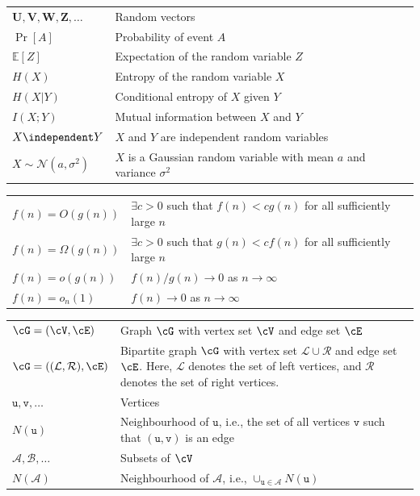 \documentclass[main.tex]{subfiles}
\begin{document}
\begin{center}
\begin{tabular}{|>{\centering}p{3cm}|p{11cm}|}
      $\mathbf{U},\mathbf{V},\mathbf{W},\mathbf{Z},\ldots$ & Random vectors\\
      $\Pr[A]$ & Probability of event $A$\\
      $\mathbb{E}[Z]$ & Expectation of the random variable $Z$\\
      $H(X)$ & Entropy of the random variable $X$\\
      $H(X|Y)$ & Conditional entropy of $X$ given $Y$\\
      $I(X;Y)$ & Mutual information between $X$ and $Y$\\
      $X\independent Y$ & $X$ and $Y$ are independent random variables\\
      $X\sim \mathcal{N}(a,\sigma^2)$ & $X$ is a Gaussian random variable with mean $a$ and variance $\sigma^2$\\
      \hline
      \end{tabular}
   \begin{tabular}{|>{\centering}p{3cm}|p{11cm}|}
      \multicolumn{2}{c}{{\bf Sequences}}\\ \hline
      $f(n)=O(g(n))$ & $\exists c>0$ such that $f(n)<cg(n)$ for all sufficiently large $n$\\
      $f(n)=\Omega(g(n))$ & $\exists c>0$ such that $g(n)<cf(n)$ for all sufficiently large $n$\\
      $f(n)=o(g(n))$ & $f(n)/g(n)\to 0$ as $n\to\infty$\\
      $f(n)=o_n(1)$ & $f(n)\to 0$ as $n\to\infty$\\
\hline
\end{tabular}
  \begin{tabular}{|>{\centering}p{3cm}|p{11cm}|}
      \multicolumn{2}{c}{{\bf Graphs}}\\ \hline
      $\cG=(\cV,\cE)$ & Graph $\cG$ with vertex set $\cV$ and edge set $\cE$\\
      $\cG=((\mathcal{L},\mathcal{R}),\cE)$ & Bipartite graph $\cG$ with vertex set $\mathcal{L}\cup \mathcal{R}$ and edge set $\cE$. Here, $\mathcal{L}$ denotes the set of left vertices, and $\mathcal{R}$ denotes the set of right vertices.\\
      $\mathtt{u},\mathtt{v},\ldots$ & Vertices\\
      $N(\mathtt{u})$ & Neighbourhood of $\mathtt{u}$, i.e., the set of all vertices $\mathtt{v}$ such that $(\mathtt{u},\mathtt{v})$ is an edge\\
      $\mathcal{A},\mathcal{B},\ldots$ & Subsets of $\cV$\\
      $N(\mathcal{A})$ & Neighbourhood of $\mathcal{A}$, i.e., $\cup_{\mathtt{u}\in \mathcal{A}}N(\mathtt{u})$\\
\hline
\end{tabular}


\end{center}
\end{document}
